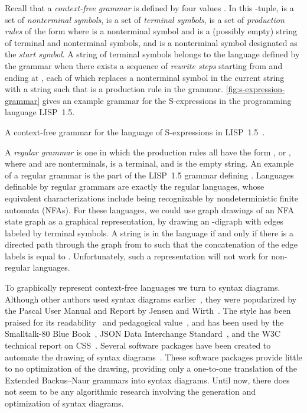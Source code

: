 \documentclass[10pt]{llncs}
\begin{document}
Recall that a \emph{context-free grammar} is defined by four values . In this -tuple,  is a set of \emph{nonterminal symbols},  is a set of \emph{terminal symbols},  is a set of \emph{production rules} of the form  where  is a nonterminal symbol and  is a (possibly empty) string of terminal and nonterminal symbols, and  is a nonterminal symbol designated as the \emph{start symbol}. A string  of terminal symbols belongs to the language defined by the grammar when there exists a sequence of \emph{rewrite steps} starting from  and ending at , each of which replaces a nonterminal symbol  in the current string with a string  such that  is a production rule in the grammar. \autoref{fig:s-expression-grammar} gives an example grammar for the S-expressions in the programming language LISP~1.5.
\begin{table}[t]

\caption{A context-free grammar for the language of S-expressions in LISP~1.5~\cite{lisp-book}.}
\label{fig:s-expression-grammar}
\end{table}

A \emph{regular grammar} is one in which the production rules all have the form ,  or , where  and  are nonterminals,  is a terminal, and  is the empty string. An example of a regular grammar is the part of the LISP~1.5 grammar defining .
Languages definable by regular grammars are exactly the regular languages, whose equivalent characterizations include being recognizable by nondeterministic finite automata (NFAs). For these languages, we could use graph drawings of an NFA state graph as a graphical representation, by drawing an -digraph with edges labeled by terminal symbols. A string  is in the language if and only if there is a directed path through the graph from  to  such that the concatenation of the edge labels is equal to . Unfortunately, such a representation will not work for non-regular languages.

To graphically represent context-free languages we turn to syntax diagrams.
Although other authors used syntax diagrams earlier~\cite{cande-book}, they were popularized by the Pascal User Manual and Report by Jensen and Wirth~\cite{pascal-book}. The style has been praised for its readability~\cite{Bra-SJCD-1990} and pedagogical value~\cite{BelGil-Bull-1974}, and has been used by the Smalltalk-80 Blue Book~\cite{smalltalk-book}, JSON Data Interchange Standard~\cite{json-web}, and the W3C technical report on CSS~\cite{css-web}. Several software packages have been created to automate the drawing of syntax diagrams~\cite{sw1-web,sw2-web,sw3-web}. These software packages provide little to no optimization of the drawing, providing only a one-to-one translation of the Extended Backus--Naur grammars into syntax diagrams. Until now, there does not seem to be any algorithmic research involving the generation and optimization of syntax diagrams.
\end{document}
